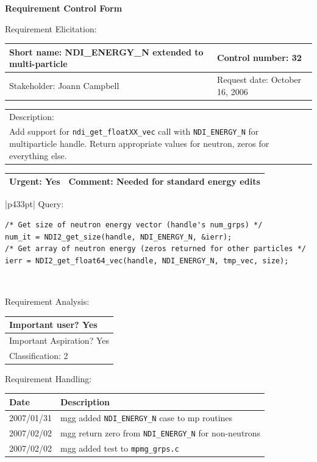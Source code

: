 \begin{center}\Large\bf
Requirement Control Form
\end{center}
\vspace{24pt}

Requirement Elicitation:

\begin{tabular}{|p{211pt}|p{211pt}|} \hline
Short name: NDI\_ENERGY\_N extended to multi-particle & Control number: 32\\ \hline
Stakeholder: Joann Campbell & Request date: October 16, 2006\\
\end{tabular}
\begin{tabular}{|p{433pt}|} \hline
Description: \\ 
Add support for \texttt{ndi\_get\_floatXX\_vec} call with
\texttt{NDI\_ENERGY\_N} for multiparticle handle.  Return appropriate
values for neutron, zeros for everything else.\\
\hline
\end{tabular} 
\begin{tabular}{|p{211pt}|p{211pt}|} \hline
Urgent: Yes & Comment: Needed for standard energy edits\\ \hline
\end{tabular}

\vspace{12pt}

\begin{tabular}{|p{433pt}|} \hline
Query:
\begin{verbatim}
/* Get size of neutron energy vector (handle's num_grps) */ 
num_it = NDI2_get_size(handle, NDI_ENERGY_N, &ierr);
/* Get array of neutron energy (zeros returned for other particles */
ierr = NDI2_get_float64_vec(handle, NDI_ENERGY_N, tmp_vec, size);
\end{verbatim}
\\ \hline
\end{tabular}
\vspace{24pt}

Requirement Analysis:

\begin{tabular}{|p{433pt}|} \hline
Important user? Yes \\ \hline
Important Aspiration? Yes \\ \hline
Classification: 2 \\ \hline
\end{tabular}
\vspace{24pt}

Requirement Handling:

\begin{tabular}{|p{72pt}|p{351pt}|} \hline
Date & Description \\ \hline
2007/01/31 & mgg added \texttt{NDI\_ENERGY\_N} case to mp routines\\ \hline
2007/02/02 & mgg return zero from \texttt{NDI\_ENERGY\_N} for non-neutrons\\
\hline
2007/02/02 & mgg added test to \texttt{mpmg\_grps.c}\\ \hline
\end{tabular}
\vspace{24pt}

